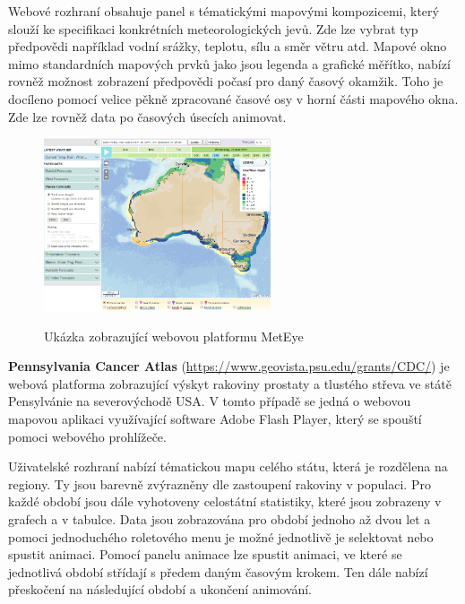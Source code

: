 Webové rozhraní obsahuje panel s tématickými mapovými kompozicemi, 
který slouží ke specifikaci konkrétních meteorologických jevů. 
Zde lze vybrat typ předpovědi 
například vodní srážky, teplotu, sílu a směr větru atd. Mapové okno
mimo standardních mapových prvků jako jsou legenda a grafické měřítko,
nabízí rovněž možnost zobrazení předpovědi počasí pro daný časový
okamžik. Toho je docíleno pomocí velice pěkně zpracované časové osy v
horní části mapového okna. Zde lze rovněž data po časových
úsecích animovat.


\begin{figure}[h!]  \centering
\includegraphics[width=0.6\textwidth]{../img/meteye.png}
	\caption{Ukázka zobrazující webovou platformu MetEye}
	\cite{met-eye}
	\label{fig:met-eye}
\end{figure}

\newpage

\textbf{Pennsylvania Cancer Atlas}
(\url{https://www.geovista.psu.edu/grants/CDC/}) je webová platforma
zobrazující výskyt rakoviny prostaty a tlustého střeva ve státě
Pensylvánie na severovýchodě USA. V tomto případě se jedná o webovou
mapovou aplikaci využívající software Adobe Flash Player, který se
spouští pomoci webového prohlížeče.

Uživatelské rozhraní nabízí tématickou mapu celého státu, která je
rozdělena na regiony. Ty jsou barevně zvýrazněny dle zastoupení
rakoviny v populaci. Pro každé období jsou dále vyhotoveny celostátní
statistiky, které jsou zobrazeny v grafech a v tabulce. Data jsou
zobrazována pro období jednoho až dvou let a pomoci jednoduchého
roletového menu je možné jednotlivě je selektovat nebo spustit
animaci. Pomocí panelu animace lze spustit animaci, ve které se
jednotlivá období střídají s předem daným časovým krokem. Ten dále
nabízí přeskočení na následující období a ukončení animování.

